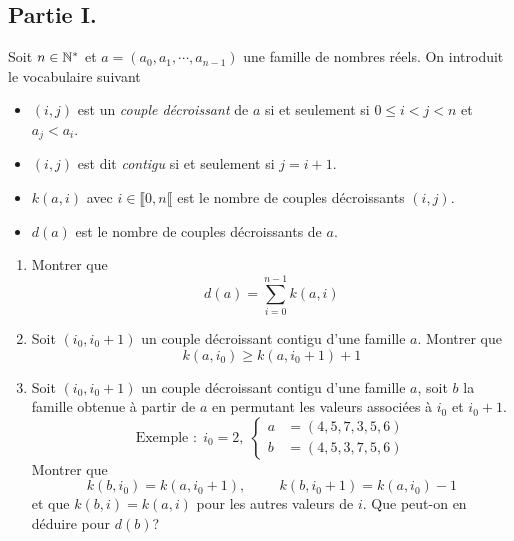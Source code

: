 \subsection*{Partie I.}
Soit $n\in \mathbb{N}^*$ et $a = (a_0,a_1,\cdots,a_{n-1})$ une famille de nombres réels. On introduit le vocabulaire suivant
\begin{itemize}
  \item $(i,j)$ est un \emph{couple décroissant} de $a$ si et seulement si $0\leq i < j < n$ et $a_j < a_i$.
  \item $(i,j)$ est dit \emph{contigu} si et seulement si $j=i+1$.
  \item $k(a,i)$ avec $i\in\llbracket 0, n\llbracket$ est le nombre de couples décroissants $(i,j)$.
  \item $d(a)$ est le nombre de couples décroissants de $a$.
\end{itemize}
\begin{enumerate}
  \item Montrer que 
\begin{displaymath}
  d(a) = \sum_{i=0}^{n-1}k(a,i)
\end{displaymath}
  \item Soit $(i_0,i_0 + 1)$ un couple décroissant contigu d'une famille $a$. Montrer que
\begin{displaymath}
  k(a,i_0) \geq k(a,i_0 + 1) + 1
\end{displaymath}
  \item Soit $(i_0,i_0 + 1)$ un couple décroissant contigu d'une famille $a$, soit $b$ la famille obtenue à partir de $a$ en permutant les valeurs associées à $i_0$ et $i_0 +1$.
\begin{displaymath}
\text{Exemple }:\;  i_0 = 2,\;
\left\lbrace 
\begin{aligned}
  a &= (4, 5, 7, 3, 5, 6) \\
  b &= (4, 5, 3, 7, 5, 6)
\end{aligned}
\right. 
\end{displaymath}
Montrer que
\begin{displaymath}
k(b,i_0) = k(a,i_0+1), \hspace{1cm}  k(b, i_0 + 1) = k(a,i_0) - 1  
\end{displaymath}
et que $k(b,i) = k(a,i)$ pour les autres valeurs de $i$. Que peut-on en déduire pour $d(b)$?
\end{enumerate}

